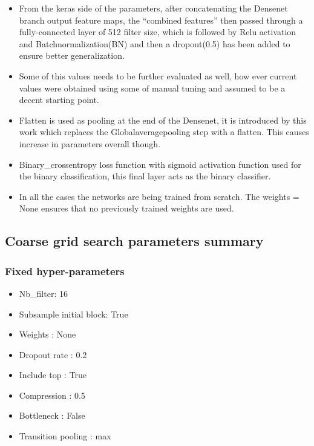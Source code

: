 \begin{itemize}
 \item From the keras side of the parameters, after concatenating the Densenet branch output feature maps, the “combined features” then passed through a fully-connected  
 layer of 512 filter size, which is followed by Relu activation and Batchnormalization(BN)  and then a dropout(0.5) has been added to ensure better generalization. 
 \item Some of this values needs to be further evaluated as well, how ever current values were obtained using some of manual tuning and assumed to be a decent starting point.
 \item Flatten is used as pooling at the end of the Densenet, it is introduced by this work which replaces the Globalaveragepooling step with a flatten. This causes increase 
 in parameters overall though.
 \item Binary\_crossentropy loss function with sigmoid activation function used for the binary classification, this final layer acts as the binary classifier.
 \item In all the cases the networks are being trained from scratch. The weights = None ensures that no previously trained weights are used.
\end{itemize}

\subsection{Coarse grid search parameters summary}
\subsubsection{Fixed hyper-parameters}
\begin{itemize}
 \item Nb\_filter: 16
 \item Subsample initial block: True
 \item Weights : None
 \item Dropout rate : 0.2
 \item Include top : True
 \item Compression : 0.5
 \item Bottleneck : False
 \item Transition pooling : max
\end{itemize}

